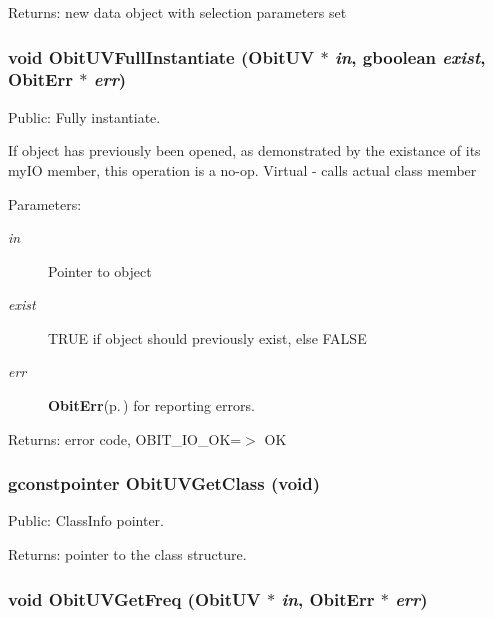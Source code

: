\begin{Desc}
\item[Returns:]new data object with selection parameters set \end{Desc}
\subsubsection{\setlength{\rightskip}{0pt plus 5cm}void Obit\-UVFull\-Instantiate ({\bf Obit\-UV} $\ast$ {\em in}, gboolean {\em exist}, {\bf Obit\-Err} $\ast$ {\em err})}\label{ObitUV_8c_a21}


Public: Fully instantiate. 

If object has previously been opened, as demonstrated by the existance of its my\-IO member, this operation is a no-op. Virtual - calls actual class member \begin{Desc}
\item[Parameters:]
\begin{description}
\item[{\em in}]Pointer to object \item[{\em exist}]TRUE if object should previously exist, else FALSE \item[{\em err}]{\bf Obit\-Err}{\rm (p.\,\pageref{structObitErr})} for reporting errors. \end{description}
\end{Desc}
\begin{Desc}
\item[Returns:]error code, OBIT\_\-IO\_\-OK=$>$ OK \end{Desc}
\subsubsection{\setlength{\rightskip}{0pt plus 5cm}gconstpointer Obit\-UVGet\-Class (void)}\label{ObitUV_8c_a13}


Public: Class\-Info pointer. 

\begin{Desc}
\item[Returns:]pointer to the class structure. \end{Desc}
\subsubsection{\setlength{\rightskip}{0pt plus 5cm}void Obit\-UVGet\-Freq ({\bf Obit\-UV} $\ast$ {\em in}, {\bf Obit\-Err} $\ast$ {\em err})}\label{ObitUV_8c_a34}


